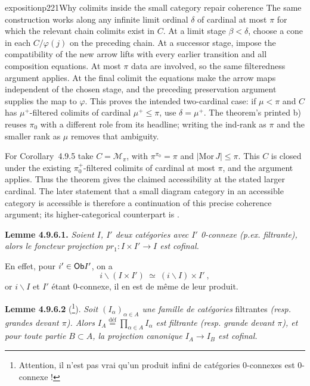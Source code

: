 \begin{dcomment}{exposition}{p221}{Why colimits inside the small category repair coherence}
The same construction works along any infinite limit ordinal $\delta$ of cardinal at most $\pi$ for which the relevant chain colimits exist in $C$. At a limit stage $\beta<\delta$, choose a cone in each $C/\varphi(j)$ on the preceding chain. At a successor stage, impose the compatibility of the new arrow lifts with every earlier transition and all composition equations. At most $\pi$ data are involved, so the same filteredness argument applies. At the final colimit the equations make the arrow maps independent of the chosen stage, and the preceding preservation argument supplies the map to $\varphi$. This proves the intended two-cardinal case: if $\mu<\pi$ and $C$ has $\mu^+$-filtered colimits of cardinal $\mu^+\leq\pi$, use $\delta=\mu^+$. The theorem's printed b) reuses $\pi_0$ with a different role from its headline; writing the ind-rank as $\pi$ and the smaller rank as $\mu$ removes that ambiguity.

For Corollary~4.9.5 take $C=\mathcal M_\pi$, with $\pi^{\pi_0}=\pi$ and $|\mathrm{Mor}\,J|\leq\pi$. This $C$ is closed under the existing $\pi_0^+$-filtered colimits of cardinal at most $\pi$, and the argument applies. Thus the theorem gives the claimed accessibility at the stated larger cardinal. The later statement that a small diagram category in an accessible category is accessible is therefore a continuation of this precise coherence argument; its higher-categorical counterpart is \citet[Proposition~5.4.4.3]{Lurie2009HTT}.
\end{dcomment}


\textbf{Lemme 4.9.6.1.} \textit{Soient $I$, $I'$ deux catégories avec $I'$ \textup{0}-connexe (p.ex. filtrante), alors le foncteur projection $pr_1 : I \times I' \longrightarrow I$ est cofinal.}

En effet, pour $i' \in \mathsf{Ob} I'$, on a
\[
i\backslash(I \times I') \ \simeq \ (i\backslash I) \times I' \ ,
\]
or $i\backslash I$ et $I'$ étant 0-connexe, il en est de même de leur produit.

\textbf{Lemme 4.9.6.2} (\footnote[97]{Attention, il n'est pas vrai qu'un produit infini de catégories 0-connexes est 0-connexe !}). \textit{Soit $(I_\alpha)_{\alpha \in A}$ une famille de catégories} filtrantes \textit{(resp. grandes devant $\pi$). Alors $I_A \stackrel{\text{déf}}{=} \prod_{\alpha \in A} I_\alpha$ est filtrante (resp. grande devant $\pi$), et pour toute partie $B \subset A$, la projection canonique $I_A \longrightarrow I_B$ est cofinal.} %

